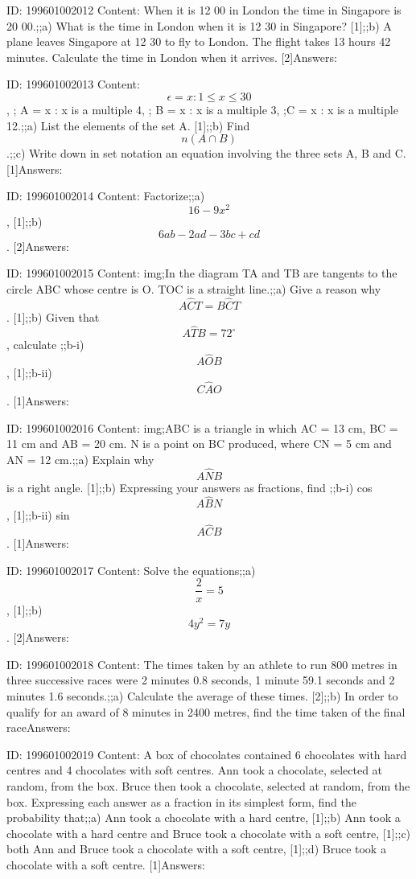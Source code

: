 \documentclass{article}
\begin{document}
ID: 199601002012
Content:
When it is 12 00 in London the time in Singapore is 20 00.;;a) What is the time in London when it is 12 30 in Singapore? [1];;b) A plane leaves Singapore at 12 30 to fly to London. The flight takes 13 hours 42 minutes. Calculate the time in London when it arrives. [2]Answers:

ID: 199601002013
Content:
$$\epsilon = {x: 1 \leq x \leq 30}$$, ; A = {x : x is a multiple 4}, ; B = {x : x is a multiple 3}, ;C = {x : x is a multiple 12}.;;a) List the elements of the set A. [1];;b) Find $$n(A \cap B)$$.;;c) Write down in set notation an equation involving the three sets A, B and C. [1]Answers:

ID: 199601002014
Content:
Factorize;;a) $$16 - 9x^2$$, [1];;b) $$6ab - 2ad - 3bc + cd$$. [2]Answers:

ID: 199601002015
Content:
img;In the diagram TA and TB are tangents to the circle ABC whose centre is O. TOC is a straight line.;;a) Give a reason why $$A \hat CT = B \hat CT$$. [1];;b) Given that $$A \hat TB = 72^{\circ}$$, calculate ;;b-i) $$A \hat OB$$, [1];;b-ii) $$C \hat AO$$. [1]Answers:

ID: 199601002016
Content:
img;ABC is a triangle in which AC = 13 cm, BC = 11 cm and AB = 20 cm. N is a point on BC produced, where CN = 5 cm and AN = 12 cm.;;a) Explain why $$A \hat NB$$ is a right angle. [1];;b) Expressing your answers as fractions, find ;;b-i) cos $$A \hat BN$$, [1];;b-ii) sin $$A \hat CB$$. [1]Answers:

ID: 199601002017
Content:
Solve the equations;;a) $$\frac{2}{x} = 5$$, [1];;b) $$4y^2 = 7y$$. [2]Answers:

ID: 199601002018
Content:
The times taken by an athlete to run 800 metres in three successive races were 2 minutes 0.8 seconds, 1 minute 59.1 seconds and 2 minutes 1.6 seconds.;;a) Calculate the average of these times. [2];;b) In order to qualify for an award of 8 minutes in 2400 metres, find the time taken of the final raceAnswers:

ID: 199601002019
Content:
A box of chocolates contained 6 chocolates with hard centres and 4 chocolates with soft centres. Ann took a chocolate, selected at random, from the box. Bruce then took a chocolate, selected at random, from the box. Expressing each answer as a fraction in its simplest form, find the probability that;;a) Ann took a chocolate with a hard centre, [1];;b) Ann took a chocolate with a hard centre and Bruce took a chocolate with a soft centre, [1];;c) both Ann and Bruce took a chocolate with a soft centre, [1];;d) Bruce took a chocolate with a soft centre. [1]Answers:
\end{document}
